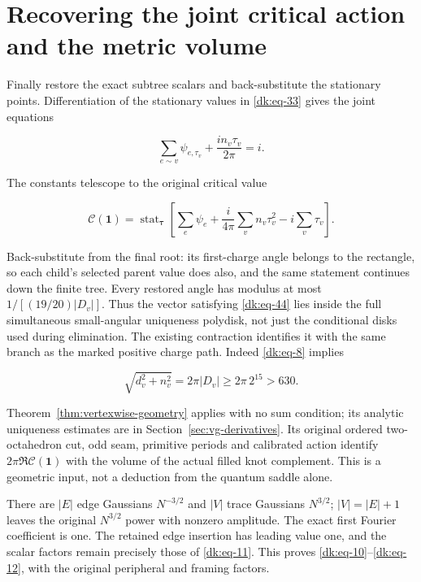 \section{Recovering the joint critical action and the metric volume}\label{dk:sec-7}

Finally restore the exact subtree scalars and back-substitute the
stationary points. Differentiation of the stationary values in
\eqref{dk:eq-33} gives the joint equations

\begin{equation}\label{dk:eq-44}
\sum_{e\sim v}\psi_{e,\tau_v}
                      +\frac{in_v\tau_v}{2\pi}=i.
\end{equation}

The constants telescope to the original critical value

\begin{equation}\label{dk:eq-45}
\mathcal C(\mathbf1)=\operatorname{stat}_{\boldsymbol\tau}
 \left[\sum_e\psi_e+
       \frac{i}{4\pi}\sum_vn_v\tau_v^2-i\sum_v\tau_v\right].
\end{equation}

Back-substitute from the final root: its first-charge angle belongs to
the rectangle, so each child's selected parent value does also, and
the same statement continues down the finite tree. Every restored angle
has modulus at most \(1/[(19/20)|D_v|]\). Thus the vector satisfying
\eqref{dk:eq-44} lies inside the full simultaneous small-angular uniqueness
polydisk, not just the conditional disks used during elimination.
The existing contraction identifies it with the same branch as the
marked positive charge path. Indeed
\eqref{dk:eq-8} implies

\begin{equation}\label{dk:eq-46}
\sqrt{d_v^2+n_v^2}=2\pi|D_v|\ge 2\pi\,2^{15}>630.
\end{equation}

Theorem~\ref{thm:vertexwise-geometry} applies with no sum condition;
its analytic uniqueness estimates are in
Section~\ref{sec:vg-derivatives}.
Its original ordered two-octahedron cut, odd seam, primitive periods and
calibrated action identify \(2\pi\Re\mathcal C(\mathbf1)\) with the volume of the actual
filled knot complement. This is a geometric input, not a deduction
from the quantum saddle alone.

There are \(|E|\) edge Gaussians \(N^{-3/2}\) and \(|V|\) trace Gaussians \(N^{3/2}\);
\(|V|=|E|+1\) leaves the original \(N^{3/2}\) power with nonzero amplitude.
The exact first Fourier coefficient is one. The retained edge insertion
has leading value one, and the scalar factors remain precisely those of
\eqref{dk:eq-11}.
This proves \eqref{dk:eq-10}--\eqref{dk:eq-12}, with the original peripheral and framing factors.

